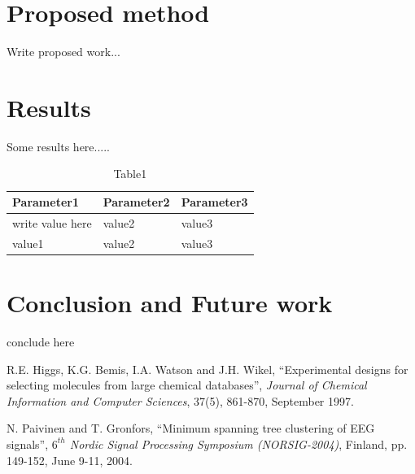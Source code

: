 \documentclass[a4paper,12pt]{report}
\begin{document}
\chapter{Proposed method}
Write proposed work...


\chapter{Results}
	
Some results here.....

\begin{table}[ht]
\centering
\caption{Table1}
\label{my-label}
\begin{tabular}{|l|l|l|}
\hline
Parameter1 & Parameter2 & Parameter3 \\ \hline
write value here & value2 & value3 \\ \hline
value1 & value2 & value3 \\ \hline
\end{tabular}
\end{table}

\chapter{Conclusion and Future work}
conclude here




\begin{thebibliography}{15}


 R.E. Higgs, K.G. Bemis, I.A. Watson and J.H. Wikel, “Experimental designs for selecting molecules from large chemical databases”, \textit{Journal of Chemical Information and Computer Sciences}, 37(5), 861-870, September 1997.

 N. Paivinen and T. Gronfors, “Minimum spanning tree clustering of EEG signals”, \textit{$6^{th}$ Nordic Signal Processing Symposium (NORSIG-2004)}, Finland, pp. 149-152, June 9-11, 2004.



  
\end{thebibliography}
\pagebreak 
\end{document}
